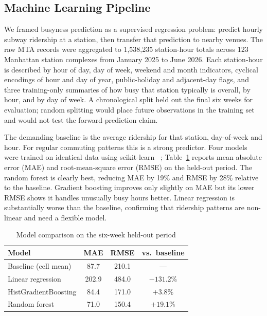 \documentclass[conference]{IEEEtran}
\begin{document}
\subsection{Machine Learning Pipeline}

We framed busyness prediction as a supervised regression problem: predict hourly subway ridership at a station, then transfer that prediction to nearby venues. The raw MTA records were aggregated to 1,538,235 station-hour totals across 123 Manhattan station complexes from January 2025 to June 2026. Each station-hour is described by hour of day, day of week, weekend and month indicators, cyclical encodings of hour and day of year, public-holiday and adjacent-day flags, and three training-only summaries of how busy that station typically is overall, by hour, and by day of week. A chronological split held out the final six weeks for evaluation; random splitting would place future observations in the training set and would not test the forward-prediction claim.

The demanding baseline is the average ridership for that station, day-of-week and hour. For regular commuting patterns this is a strong predictor. Four models were trained on identical data using scikit-learn~
\cite{pedregosa2011scikit}; Table~\ref{tab:modelcomparison} reports mean absolute error (MAE) and root-mean-square error (RMSE) on the held-out period. The random forest is clearly best, reducing MAE by 19\% and RMSE by 28\% relative to the baseline. Gradient boosting improves only slightly on MAE but its lower RMSE shows it handles unusually busy hours better. Linear regression is substantially worse than the baseline, confirming that ridership patterns are non-linear and need a flexible model.

\begin{table}[htbp]
\caption{Model comparison on the six-week held-out period}
\label{tab:modelcomparison}
\begin{center}
\scriptsize
\setlength{\tabcolsep}{3pt}
\begin{tabular}{@{}|l|c|c|c|@{}}
\hline
\textbf{Model} & \textbf{MAE} & \textbf{RMSE} & \textbf{vs.~baseline} \\
\hline
Baseline (cell mean) & 87.7 & 210.1 & --- \\
\hline
Linear regression & 202.9 & 484.0 & $-131.2$\% \\
\hline
HistGradientBoosting & 84.4 & 171.0 & $+3.8$\% \\
\hline
Random forest & 71.0 & 150.4 & $+19.1$\% \\
\hline
\end{tabular}
\end{center}
\end{table}
\end{document}
